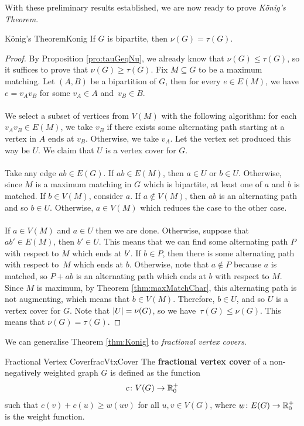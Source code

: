 \documentclass[math]{amznotes}
\theoremstyle{remark}
\newcommand{\0}{\mathbf{0}}
\newcommand{\1}{\mathbf{1}}
\begin{document}
With these preliminary results established, we are now ready to prove \textit{K\"{o}nig's Theorem}.
\begin{thmbox}{K\"{o}nig's Theorem}{Konig}
    If $G$ is bipartite, then $\nu(G) = \tau(G)$.
    \tcblower
    \begin{proof}
        By Proposition \ref{pro:tauGeqNu}, we already know that $\nu(G) \leq \tau(G)$, so it suffices to prove that $\nu(G) \geq \tau(G)$. Fix $M \subseteq G$ to be a maximum matching. Let $(A, B)$ be a bipartition of $G$, then for every $e \in E(M)$, we have $e = v_Av_B$ for some $v_A \in A$ and~$v_B \in B$.
        \\\\
        We select a subset of vertices from $V(M)$ with the following algorithm: for each $v_Av_B \in E(M)$, we take $v_B$ if there exists some alternating path starting at a vertex in $A$ ends at $v_B$. Otherwise, we take $v_A$. Let the vertex set produced this way be $U$. We claim that $U$ is a vertex cover for $G$.
        \\\\
        Take any edge $ab \in E(G)$. If $ab \in E(M)$, then $a \in U$ or $b \in U$. Otherwise, since $M$ is a maximum matching in $G$ which is bipartite, at least one of $a$ and $b$ is matched.  If $b \in V(M)$, consider $a$. If $a \notin V(M)$, then $ab$ is an alternating path and so $b \in U$. Otherwise, $a \in V(M)$ which reduces the case to the other case.
        \\\\
        If $a \in V(M)$ and $a \in U$ then we are done. Otherwise, suppose that $ab' \in E(M)$, then $b' \in U$. This means that we can find some alternating path $P$ with respect to $M$ which ends at $b'$. If $b \in P$, then there is some alternating path with respect to~$M$ which ends at $b$. Otherwise, note that $a \notin P$ because $a$ is matched, so $P + ab$ is an alternating path which ends at $b$ with respect to $M$. Since $M$ is maximum, by Theorem \ref{thm:maxMatchChar}, this alternating path is not augmenting, which means that $b \in V(M)$. Therefore, $b \in U$, and so $U$ is a vertex cover for $G$. Note that ${\left\lvert {U} \right\rvert} = \nu(G)$, so we have~$\tau(G) \leq \nu(G)$. This means that $\nu(G) = \tau(G)$.
    \end{proof}
\end{thmbox}
We can generalise Theorem \ref{thm:Konig} to \textit{fractional vertex covers}.
\begin{dfnbox}{Fractional Vertex Cover}{fracVtxCover}
    The {\color{red} \textbf{fractional vertex cover}} of a non-negatively weighted graph $G$ is defined as the function
    \begin{equation*}
        c \colon V(G) \to \mathbb{R}^+_0
    \end{equation*}
    such that $c(v) + c(u) \geq w(uv)$ for all $u, v \in V(G)$, where $w \colon E(G) \to \mathbb{R}^+_0$ is the weight function.
\end{dfnbox}
\end{document}
